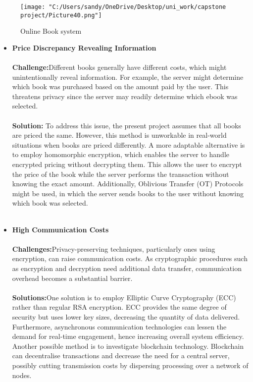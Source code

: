 \documentclass[12pt]{article}
\begin{document}
\begin{figure}[H]
	\centering
	\texttt{[image: "C:/Users/sandy/OneDrive/Desktop/uni\_work/capstone project/Picture40.png"]}
	\caption{Online Book system }
	
\end{figure}
\begin{itemize}

	
	\item \textbf{Price Discrepancy Revealing Information}\\\\
	\textbf{Challenge:}Different books generally have different costs, which might unintentionally reveal information. For example, the server might determine which book was purchased based on the amount paid by the user. This threatens privacy since the server may readily determine which ebook was selected.
	\\\\
	\textbf{Solution:} To address this issue, the present project assumes that all books are priced the same. However, this method is unworkable in real-world situations when books are priced differently.
	A more adaptable alternative is to employ homomorphic encryption, which enables the server to handle encrypted pricing without decrypting them. This allows the user to encrypt the price of the book while the server performs the transaction without knowing the exact amount. Additionally, Oblivious Transfer (OT) Protocols might be used, in which the server sends books to the user without knowing which book was selected.
	~\cite{Boneh2005} \\\\
	
	
	
	\item \textbf{High Communication Costs}
	\\\\
	\textbf{Challenges:}Privacy-preserving techniques, particularly ones using encryption, can raise communication costs. As cryptographic procedures such as encryption and decryption need additional data transfer, communication overhead becomes a substantial barrier.\\\\
	\textbf{Solutions:}One solution is to employ Elliptic Curve Cryptography (ECC) rather than regular RSA encryption. ECC provides the same degree of security but uses lower key sizes, decreasing the quantity of data delivered. Furthermore, asynchronous communication technologies can lessen the demand for real-time engagement, hence increasing overall system efficiency. 
	Another possible method is to investigate blockchain technology. Blockchain can decentralise transactions and decrease the need for a central server, possibly cutting transmission costs by dispersing processing over a network of nodes.~\cite{Bernstein2005}
	\\\\
	

\end{itemize}
\end{document}
